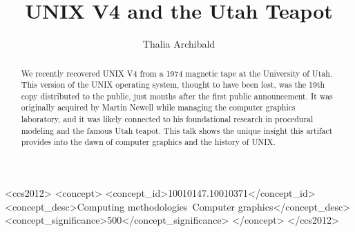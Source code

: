 \documentclass[sigconf]{acmart}
\begin{document}
\title{UNIX V4 and the Utah Teapot}
\author{Thalia Archibald}

\begin{abstract}
We recently recovered UNIX V4 from a 1974 magnetic tape at the University of Utah.
This version of the UNIX operating system, thought to have been lost, was the 19th copy distributed to the public, just months after the first public announcement.
It was originally acquired by Martin Newell while managing the computer graphics laboratory, and it was likely connected to his foundational research in procedural modeling and the famous Utah teapot.
This talk shows the unique insight this artifact provides into the dawn of computer graphics and the history of UNIX.
\end{abstract}

\begin{CCSXML}
<ccs2012>
<concept>
<concept_id>10010147.10010371</concept_id>
<concept_desc>Computing methodologies~Computer graphics</concept_desc>
<concept_significance>500</concept_significance>
</concept>
</ccs2012>
\end{CCSXML}


\maketitle




\end{document}
